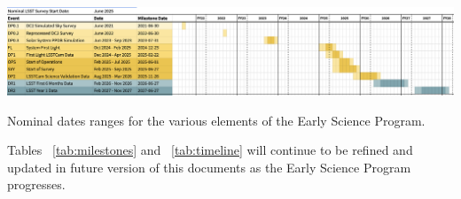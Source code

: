 \begin{table}[ht]
\centering
\includegraphics[width=\linewidth]{figures/DPR-timeline}
\caption{Nominal dates ranges for the various elements of the Early Science Program.}
\label{tab:timeline}
\end{table}

Tables ~\ref{tab:milestones} and ~\ref{tab:timeline} will continue to be refined and updated in future version of this documents as the Early Science Program progresses.
